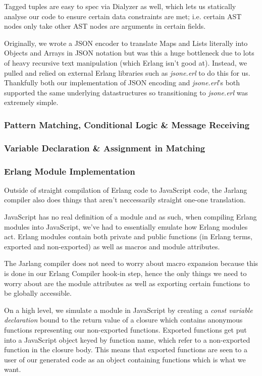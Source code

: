 \documentclass[twoside,12pt,titlepage,a4paper]{article}
\begin{document}
Tagged tuples are easy to spec via Dialyzer as well, which lets us statically analyse our code to ensure certain data constraints are met; i.e. certain AST nodes only take other AST nodes are arguments in certain fields.

Originally, we wrote a JSON encoder to translate Maps and Lists literally into Objects and Arrays in JSON notation but  was this a huge bottleneck due to lots of heavy recursive text manipulation (which Erlang isn't good at). Instead, we pulled and relied on external Erlang libraries such as \textit{jsone.erl} to do this for us. Thankfully both our implementation of JSON encoding and \textit{jsone.erl}'s both supported the same underlying datastructures so transitioning to \textit{jsone.erl} was extremely simple.

\subsubsection{Pattern Matching, Conditional Logic \& Message Receiving}
\subsubsection{Variable Declaration \& Assignment in Matching}

\subsubsection{Erlang Module Implementation} \label{sssec:num1}
Outside of straight compilation of Erlang code to JavaScript code, the Jarlang compiler also does things that aren't neccessarily straight one-one translation.

JavaScript has no real definition of a module and as such, when compiling Erlang modules into JavaScript, we've had to essentially emulate how Erlang modules act. Erlang modules contain both private and public functions (in Erlang terms, exported and non-exported) as well as macros and module attributes.

The Jarlang compiler does not need to worry about macro expansion because this is done in our Erlang Compiler hook-in step, hence the only things we need to worry about are the module attributes as well as exporting certain functions to be globally accessible.

On a high level, we simulate a module in JavaScript by creating a \textit{const variable declaration} bound to the return value of a closure which contains anonymous functions representing our non-exported functions. Exported functions get put into a JavaScript object keyed by function name, which refer to a non-exported function in the closure body. This means that exported functions are seen to a user of our generated code as an object containing functions which is what we want.
\end{document}
